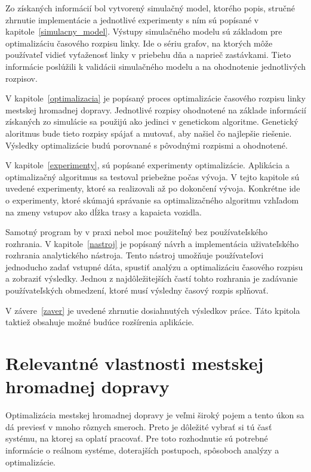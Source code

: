 Zo získaných informácií bol vytvorený simulačný model, ktorého popis, stručné zhrnutie implementácie a jednotlivé experimenty s ním sú popísané v kapitole~\ref{simulacny_model}.
Výstupy simulačného modelu sú základom pre optimalizáciu časového rozpisu linky.
Ide o sériu grafov, na ktorých môže používateľ vidieť vyťaženosť linky v priebehu dňa a naprieč zastávkami.
Tieto informácie poslúžili k validácii simulačného modelu a na ohodnotenie jednotlivých rozpisov.

V kapitole~\ref{optimalizacia} je popísaný proces optimalizácie časového rozpisu linky mestskej hromadnej dopravy.
Jednotlivé rozpisy ohodnotené na základe informácií získaných zo simulácie sa použijú ako jedinci v genetickom algoritme.
Genetický aloritmus bude tieto rozpisy spájať a mutovať, aby našiel čo najlepšie riešenie.
Výsledky optimalizácie budú porovnané s pôvodnými rozpismi a ohodnotené.

V kapitole~\ref{experimenty}, sú popísané experimenty optimalizácie.
Aplikácia a optimalizačný algoritmus sa testoval priebežne počas vývoja.
V tejto kapitole sú uvedené experimenty, ktoré sa realizovali až po dokončení vývoja.
Konkrétne ide o experimenty, ktoré skúmajú správanie sa optimalizačného algoritmu vzhľadom na zmeny vstupov ako dĺžka trasy a kapaicta vozidla.

Samotný program by v praxi nebol moc použiteľný bez používateľského rozhrania.
V kapitole~\ref{nastroj} je popísaný návrh a implementácia uživateľského rozhrania analytického nástroja.
Tento nástroj umožňuje používateľovi jednoducho zadať vstupné dáta, spustiť analýzu a optimalizáciu časového rozpisu a zobraziť výsledky.
Jednou z najdôležitejších častí tohto rozhrania je zadávanie používateľských obmedzení, ktoré musí výsledny časový rozpis splňovať.

V závere~\ref{zaver} je uvedené zhrnutie dosiahnutých výsledkov práce.
Táto kpitola taktiež obsahuje možné budúce rozšírenia aplikácie.

\chapter{Relevantné vlastnosti mestskej hromadnej dopravy}\label{relevantne_vlastnosti}

Optimalizácia mestskej hromadnej dopravy je veľmi široký pojem a tento úkon sa dá previesť v mnoho rôznych smeroch.
Preto je dôležité vybrať si tú časť systému, na ktorej sa oplatí pracovať.
Pre toto rozhodnutie sú potrebné informácie o reálnom systéme, doterajších postupoch, spôsoboch analýzy a optimalizácie.

